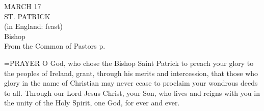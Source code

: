 \begin{center}\normalsize MARCH 17\\
\footnotesize ST. PATRICK\\
\footnotesize (in England: feast)\\
\footnotesize Bishop\\
\footnotesize From the Common of Pastors p. \\
\end{center}

\hangindent=\parindent \small{PRAYER 
O God, who chose the Bishop Saint Patrick
to preach your glory to the peoples of Ireland,
grant, through his merits and intercession,
that those who glory in the name of Christian
may never cease to proclaim your wondrous deeds to all.
Through our Lord Jesus Christ, your Son,
who lives and reigns with you in the unity of the Holy Spirit,
one God, for ever and ever.\\}
 
